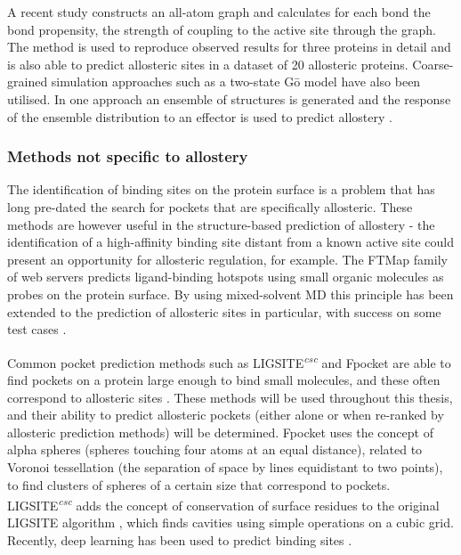 A recent study \cite{Amor2016} constructs an all-atom graph and calculates for each bond the bond propensity, the strength of coupling to the active site through the graph.
The method is used to reproduce observed results for three proteins in detail and is also able to predict allosteric sites in a dataset of 20 allosteric proteins.
Coarse-grained simulation approaches such as a two-state G\={o} model have also been utilised.
In one approach an ensemble of structures is generated and the response of the ensemble distribution to an effector is used to predict allostery \cite{Qi2012}.


\subsubsection{Methods not specific to allostery}

The identification of binding sites on the protein surface is a problem that has long pre-dated the search for pockets that are specifically allosteric.
These methods are however useful in the structure-based prediction of allostery - the identification of a high-affinity binding site distant from a known active site could present an opportunity for allosteric regulation, for example.
The FTMap family of web servers \cite{Kozakov2015} predicts ligand-binding hotspots using small organic molecules as probes on the protein surface.
By using mixed-solvent MD this principle has been extended to the prediction of allosteric sites in particular, with success on some test cases \cite{Ghanakota2016}.

Common pocket prediction methods such as LIGSITE\textsuperscript{\it csc} \cite{Huang2006} and Fpocket \cite{LeGuilloux2009} are able to find pockets on a protein large enough to bind small molecules, and these often correspond to allosteric sites \cite{Huang2013}.
These methods will be used throughout this thesis, and their ability to predict allosteric pockets (either alone or when re-ranked by allosteric prediction methods) will be determined.
Fpocket uses the concept of alpha spheres (spheres touching four atoms at an equal distance), related to Voronoi tessellation (the separation of space by lines equidistant to two points), to find clusters of spheres of a certain size that correspond to pockets.
LIGSITE\textsuperscript{\it csc} adds the concept of conservation of surface residues to the original LIGSITE algorithm \cite{Hendlich1997}, which finds cavities using simple operations on a cubic grid.
Recently, deep learning has been used to predict binding sites \cite{Jimenez2017}.


